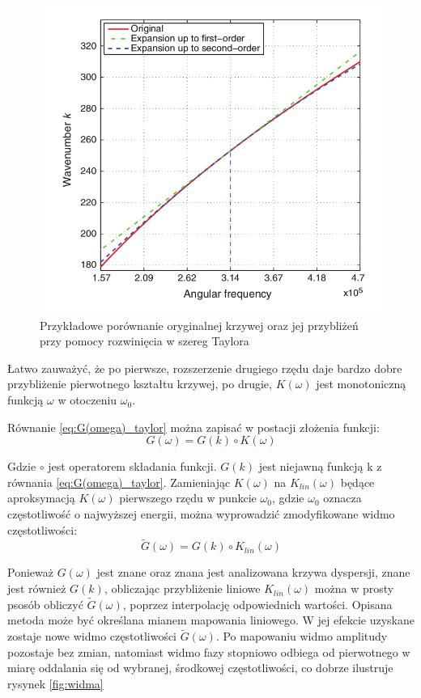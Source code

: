 \begin{figure}[h]
\centering
\includegraphics[width=14cm]{Zdjecia/4/buba}
\caption{Przykładowe porównanie oryginalnej krzywej oraz jej przybliżeń przy pomocy rozwinięcia w szereg Taylora \cite{kasia5}}
\label{fig:krzywa_taylorem}
\end{figure}

Łatwo zauważyć, że po pierwsze, rozszerzenie drugiego rzędu daje bardzo dobre przybliżenie pierwotnego kształtu krzywej, po drugie, $K(\omega)$ jest monotoniczną funkcją $\omega$ w otoczeniu $\omega _0$. 

Równanie \ref{eq:G(omega)_taylor} można zapisać w postacji złożenia funkcji:
\begin{equation}
G(\omega) = G(k)\circ K(\omega)
\end{equation}

Gdzie $\circ$ jest operatorem składania funkcji. $G(k)$ jest niejawną funkcją k z równania \ref{eq:G(omega)_taylor}. Zamieniając $K(\omega)$ na $K_{lin}(\omega)$ będące aproksymacją $K(\omega)$ pierwszego rzędu w punkcie $\omega _0$, gdzie $\omega _0$ oznacza częstotliwość o najwyższej energii, można wyprowadzić zmodyfikowane widmo częstotliwości:
\begin{equation}
\widetilde{G}(\omega) = G(k)\circ K_{lin}(\omega)
\end{equation}

Ponieważ $G(\omega)$ jest znane oraz znana jest analizowana krzywa dyspersji, znane jest również $G(k)$, obliczając przybliżenie liniowe $K_{lin}(\omega)$ można w prosty psosób obliczyć $\widetilde{G}(\omega)$, poprzez interpolację odpowiednich wartości. Opisana metoda może być określana mianem mapowania liniowego. W jej efekcie uzyskane zostaje nowe widmo częstotliwości $\widetilde{G}(\omega)$. Po mapowaniu widmo amplitudy pozostaje bez zmian, natomiast widmo fazy stopniowo odbiega od pierwotnego w miarę oddalania się od wybranej, środkowej częstotliwości, co dobrze ilustruje rysynek \ref{fig:widma}

